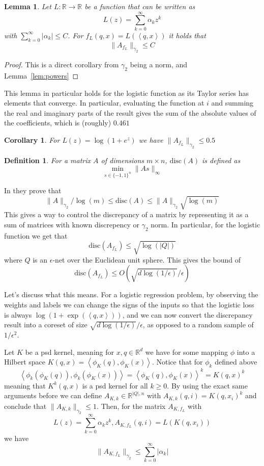 \documentclass{article} %
\newtheorem{lemma}[theorem]{Lemma}
\newtheorem{corollary}[theorem]{Corollary}
\newcommand{\ip}[1]{\left \langle #1 \right \rangle}
\newcommand{\R}{\mathbb{R}}
\newcommand{\eps}{\epsilon}
\newcommand{\disc}{\text{disc}}
\newtheorem{definition}{Definition}
\begin{document}
\begin{lemma}
Let $L:\R \to \R$ be a function that can be written as 
$$ L(z) = \sum_{k=0}^\infty \alpha_k z^k$$
with $\sum_{k=0}^{\infty} |\alpha_k| \leq C$. For $f_L(q,x) = L(\ip{q,x})$ it holds that 
$$ \|A_{f_L}\|_{\gamma_2} \leq C $$
\end{lemma}
\begin{proof}
This is a direct corollary from $\gamma_2$ being a norm, and Lemma~\ref{lem:powers}
\end{proof}

This lemma in particular holds for the logistic function as its Taylor series has elements that converge. In particular, evaluating the function at $i$ and summing the real and imaginary parts of the result gives the sum of the absolute values of the coefficients, which is (roughly) $0.461$
\begin{corollary}
For $L(z) = \log(1+e^z)$ we have $\|A_{f_L}\|_{\gamma_2} \leq 0.5$
\end{corollary}

\begin{definition}
For a matrix $A$ of dimensions $m \times n$, $\disc(A)$ is defined as 
$$ \min_{s \in \{-1,1\}^n} \|As\|_\infty $$
\end{definition}
In \cite{matouvsek2014factorization} they prove that 
$$\|A\|_{\gamma_2} / \log(m) \leq \disc(A) \leq \|A\|_{\gamma_2}  \sqrt{\log(m)}$$
This gives a way to control the discrepancy of a matrix by representing it as a sum of matrices with known discrepency or $\gamma_2$ norm. In particular, for the logistic function we get that 
$$\disc(A_{f_L}) \leq \sqrt{\log(|Q|)} $$
where $Q$ is an $\eps$-net over the Euclidean unit sphere. This gives the bound of 
$$\disc(A_{f_L}) \leq O(\sqrt{d\log(1/\eps)}/\eps) $$

Let's discuss what this means. For a logistic regression problem, by observing the weights and labels we can change the signs of the inputs so that the logistic loss is always $\log(1+\exp(\ip{q,x}))$, and we can now convert the discrepancy result into a coreset of size $\sqrt{d\log(1/\eps)}/\eps$, as opposed to a random sample of $1/\eps^2$. 

Let $K$ be a psd kernel, meaning for $x,q \in \R^d$ we have for some mapping $\phi$ into a Hilbert space $K(q,x) = \ip{\phi_K(q), \phi_K(x)}$. Notice that for $\phi_k$ defined above
$$ \ip{\phi_k(\phi_K(q)), \phi_k(\phi_K(x))} = \ip{\phi_K(q), \phi_K(x)}^k = K(q,x)^k $$
meaning that $K^k(q,x)$ is a psd kernel for all $k \geq 0$. By using the exact same arguments before we can define $A_{K,k} \in \R^{|Q|,n}$ with $A_{K,k}(q,i) = K(q, x_i)^k$ and conclude that $\|A_{K,k}\|_{\gamma_2} \leq 1$. Then, for the matrix $A_{K,f_L}$ with
$$ L(z) = \sum_{k=0}^\infty \alpha_k z^k, A_{K,f_L}(q,i) = L(K(q,x_i))$$
we have 
$$\|A_{K,f_L}\|_{\gamma_2} \leq \sum_{k=0}^{\infty} |\alpha_k| $$
\end{document}

